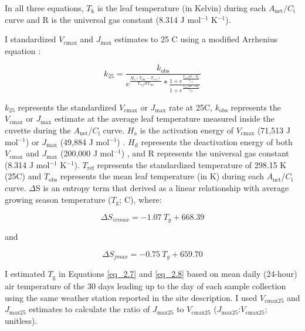 \noindent In all three equations, $T_\mathrm{k}$ is the leaf temperature (in Kelvin) during each $A_\mathrm{net}/C_\mathrm{i}$ curve and R is the universal gas constant (8.314 J mol$^{-1}$ K$^{-1}$).

I standardized $V_\mathrm{cmax}$ and $J_\mathrm{max}$ estimates to 25 \textdegree{}C using a modified Arrhenius equation :

\begin{equation} \label{eq_2.6}
    k_\mathrm{25}=\frac{k_\mathrm{obs}}{e^{\frac{H_a(T_{obs}-T_{ref})}{T_{ref}RT_{obs}}}*\frac{1+e^{\frac{T_{ref}\Delta S-H_d}{T_{ref}}}}{1+e^{\frac{T_{obs}\Delta S-H_d}{T_{obs}}}}}
\end{equation}

\noindent $k_\mathrm{25}$ represents the standardized $V_\mathrm{cmax}$ or $J_\mathrm{max}$ rate at 25\textdegree{}C, $k_\mathrm{obs}$ represents the $V_\mathrm{cmax}$ or $J_\mathrm{max}$ estimate at the average leaf temperature measured inside the cuvette during the $A_\mathrm{net}$/$C_\mathrm{i}$ curve. $H_\mathrm{a}$ is the activation energy of $V_{\mathrm{cmax}}$ (71,513 J mol$^{-1}$)  or $J_\mathrm{max}$ (49,884 J mol$^{-1}$) . $H_\mathrm{d}$ represents the deactivation energy of both $V_\mathrm{cmax}$ and $J_\mathrm{max}$ (200,000 J mol$^{-1}$) , and R represents the universal gas constant (8.314 J mol$^{-1}$ K$^{-1}$). $T_\mathrm{ref}$ represents the standardized temperature of 298.15 K (25\textdegree{}C) and $T_\mathrm{obs}$ represents the mean leaf temperature (in K) during each $A_\mathrm{net}$/$C_\mathrm{i}$ curve. $\Delta$S is an entropy term that  derived as a linear relationship with average growing season temperature ($T_\mathrm{g}$; \textdegree{}C), where: 

\begin{equation} \label{eq_2.7}
    \Delta S_{vcmax}=-1.07\ T_{g}+668.39
\end{equation}
    
\noindent and
   
\begin{equation} \label{eq_2.8}
    \Delta S_{jmax}=-0.75\ T_{g}+659.70
\end{equation}

\noindent I estimated $T_\mathrm{g}$ in Equations \ref{eq_2.7} and \ref{eq_2.8} based on mean daily (24-hour) air temperature of the 30 days leading up to the day of each sample collection using the same weather station reported in the site description. I used $V_\mathrm{cmax25}$ and $J_\mathrm{max25}$ estimates to calculate the ratio of $J_\mathrm{max25}$ to $V_\mathrm{cmax25}$ ($J_\mathrm{max25}$:$V_\mathrm{cmax25}$; unitless).

